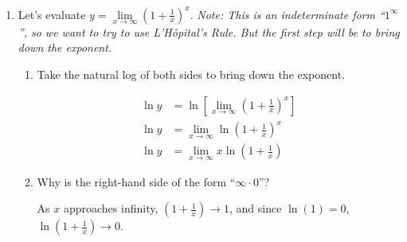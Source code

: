 \documentclass[main]{subfiles}
\begin{document}
\begin{enumerate}
\begin{solution}
  This limit is not as easily deduced as the previous ones. On the one hand, we 
  have numbers greater than $1$ being raised to larger and larger powers. This
  suggests that the limit could be $\infty$. On the other hand, as $x$ increases,
  $x=1$, $2$, $3$, \dots , we multiply by numbers that are closer and closer to
  $1$, which means $(1+\frac{1}{x})^x$ grows more and more slowly and may
  eventually approach some fixed number.
  
\end{solution}

\item
  
  Let's evaluate $y=\lim\limits_{x\to\infty} \left(1+\frac{1}{x}\right)^x$.
  \emph{Note: This is an indeterminate form ``$1^{\infty}$'', so we want to
  try to use L'Hôpital's Rule. But the first step will be to bring down the
  exponent.}

  \begin{enumerate}[topsep=0pt]
    \item 
    \begin{problem}
      Take the natural log of both sides to bring down the exponent.
    \end{problem}

    \begin{solution}
    \begin{align*}
        \ln y &= \ln \left[\lim_{x\to\infty} \left(1+\frac{1}{x}\right)^x\right] \\
        \ln y &= \lim_{x\to\infty} \ln \left(1+\frac{1}{x}\right)^x \\
        \ln y &= \lim_{x\to\infty} x \ln\left(1+\frac{1}{x}\right)
    \end{align*}
    \end{solution}


    \item
    \begin{problem}
      Why is the right-hand side of the form ``$\infty \cdot 0$''?
    \end{problem}

    \begin{solution}
      As $x$ approaches infinity, $\left(1+\frac{1}{x}\right) \to 1$,
      and since $\ln(1) = 0$, 
      $\ln  \left(1+\frac{1}{x}\right) \to 0$.
    \end{solution}


\end{enumerate}
\end{enumerate}
\end{document}
